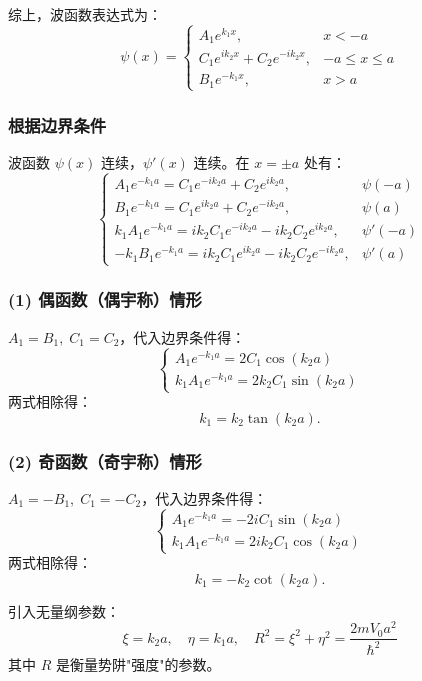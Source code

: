 综上，波函数表达式为：
\[
\psi(x) = 
\begin{cases}
	A_1 e^{k_1 x}, & x < -a \\
	C_1 e^{i k_2 x} + C_2 e^{-i k_2 x}, & -a \leq x \leq a \\
	B_1 e^{-k_1 x}, & x > a
\end{cases}
\]

\subsubsection*{根据边界条件}
波函数 $\psi(x)$ 连续，$\psi'(x)$ 连续。在 $x = \pm a$ 处有：
\[
\begin{cases}
	A_1 e^{-k_1 a} = C_1 e^{-i k_2 a} + C_2 e^{i k_2 a}, & \psi(-a) \\
	B_1 e^{-k_1 a} = C_1 e^{i k_2 a} + C_2 e^{-i k_2 a}, & \psi(a) \\
	k_1 A_1 e^{-k_1 a} = i k_2 C_1 e^{-i k_2 a} - i k_2 C_2 e^{i k_2 a}, & \psi'(-a) \\
	-k_1 B_1 e^{-k_1 a} = i k_2 C_1 e^{i k_2 a} - i k_2 C_2 e^{-i k_2 a}, & \psi'(a)
\end{cases}
\]
\begin{center}
	\textit{	}
\end{center}


\subsubsection*{(1) 偶函数（偶宇称）情形}
$A_1 = B_1,\; C_1 = C_2$，代入边界条件得：
\[
\begin{cases}
	A_1 e^{-k_1 a} = 2 C_1 \cos(k_2 a) \\
	k_1 A_1 e^{-k_1 a} = 2 k_2 C_1 \sin(k_2 a)
\end{cases}
\]
两式相除得：
\[
k_1 = k_2 \tan(k_2 a).
\]

\subsubsection*{(2) 奇函数（奇宇称）情形}
$A_1 = -B_1,\; C_1 = -C_2$，代入边界条件得：
\[
\begin{cases}
	A_1 e^{-k_1 a} = -2i C_1 \sin(k_2 a) \\
	k_1 A_1 e^{-k_1 a} = 2i k_2 C_1 \cos(k_2 a)
\end{cases}
\]
两式相除得：
\[
k_1 = -k_2 \cot(k_2 a).
\]

引入无量纲参数：
\[
\xi = k_2 a, \quad \eta = k_1 a, \quad R^2 = \xi^2 + \eta^2 = \frac{2m V_0 a^2}{\hbar^2}
\]
其中 $R$ 是衡量势阱"强度"的参数。

